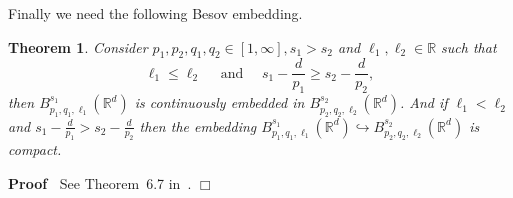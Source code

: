 \documentclass{article}
\newcommand{\infixand}{\text{ and }}
\newenvironment{proof}{\noindent\textbf{Proof\ }}{\hspace*{\fill}$\Box$\medskip}
\newtheorem{theorem}{Theorem}
\begin{document}
Finally we need the following Besov embedding.

\begin{theorem}
  \label{thm-BesovEmbedding}Consider $p_1, p_2, q_1, q_2 \in [1, \infty], s_1
  > s_2$ and $\ell_1, \ell_2 \in \mathbb{R}$ such that
  \[       \ell_1 \leqslant \ell_2 \quad \infixand \quad s_1 - \frac{d}{p_1} \geqslant s_2 -
       \frac{d}{p_2},
      \]
  then $B_{p_1, q_1, \ell_1}^{s_1} (\mathbb{R}^d)$ is continuously embedded in
  $B_{p_2, q_2, \ell_2}^{s_2} (\mathbb{R}^d)$. And if $\ell_1 < \ell_2$ and
  $s_1 - \frac{d}{p_1} > s_2 - \frac{d}{p_2}$ then the embedding $B_{p_1, q_1,
  \ell_1}^{s_1} (\mathbb{R}^d) \hookrightarrow B_{p_2, q_2, \ell_2}^{s_2}
  (\mathbb{R}^d)$ is compact. 
\end{theorem}

\begin{proof}
  See Theorem~6.7 in~{\cite{TriebelIII}}.
\end{proof}
\end{document}
